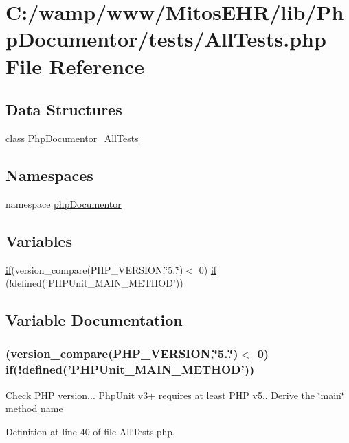 \hypertarget{_all_tests_8php}{\section{\-C\-:/wamp/www/\-Mitos\-E\-H\-R/lib/\-Php\-Documentor/tests/\-All\-Tests.php \-File \-Reference}
\label{_all_tests_8php}
}
\subsection*{\-Data \-Structures}
\begin{DoxyCompactItemize}
\item 
class \hyperlink{class_php_documentor___all_tests}{\-Php\-Documentor\-\_\-\-All\-Tests}
\end{DoxyCompactItemize}
\subsection*{\-Namespaces}
\begin{DoxyCompactItemize}
\item 
namespace \hyperlink{namespacephp_documentor}{php\-Documentor}
\end{DoxyCompactItemize}
\subsection*{\-Variables}
\begin{DoxyCompactItemize}
\item 
\hyperlink{_setup_8inc_8php_ad0184337b31d13763ec8751feff4aabe}{if}(version\-\_\-compare(\-P\-H\-P\-\_\-\-V\-E\-R\-S\-I\-O\-N,\char`\"{}5..\char`\"{})$<$ 0) \hyperlink{_all_tests_8php_aa6d4b59d70b190cd62c5a0ff127fd8a3}{if} (!defined('\-P\-H\-P\-Unit\-\_\-\-M\-A\-I\-N\-\_\-\-M\-E\-T\-H\-O\-D'))
\end{DoxyCompactItemize}


\subsection{\-Variable \-Documentation}
\hypertarget{_all_tests_8php_aa6d4b59d70b190cd62c5a0ff127fd8a3}{
\subsubsection[{if}]{ (version\-\_\-compare(\-P\-H\-P\-\_\-\-V\-E\-R\-S\-I\-O\-N,\char`\"{}5..\char`\"{})$<$ 0) {\bf if}(!defined('\-P\-H\-P\-Unit\-\_\-\-M\-A\-I\-N\-\_\-\-M\-E\-T\-H\-O\-D'))}}\label{_all_tests_8php_aa6d4b59d70b190cd62c5a0ff127fd8a3}
\-Check \-P\-H\-P version... \-Php\-Unit v3+ requires at least \-P\-H\-P v5.. \-Derive the \char`\"{}main\char`\"{} method name 

\-Definition at line 40 of file \-All\-Tests.\-php.

